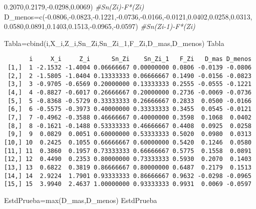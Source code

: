 \documentclass[
  a4paper,
  oneside,
  openany]{book}
\newenvironment{Shaded}{\begin{snugshade}}{\end{snugshade}}
\newcommand{\CommentTok}[1]{\textcolor[rgb]{0.56,0.35,0.01}{\textit{#1}}}
\newcommand{\FloatTok}[1]{\textcolor[rgb]{0.00,0.00,0.81}{#1}}
\newcommand{\FunctionTok}[1]{\textcolor[rgb]{0.00,0.00,0.00}{#1}}
\newcommand{\NormalTok}[1]{#1}
\newcommand{\OtherTok}[1]{\textcolor[rgb]{0.56,0.35,0.01}{#1}}
\newcommand{\SpecialCharTok}[1]{\textcolor[rgb]{0.00,0.00,0.00}{#1}}
\begin{document}
\begin{Shaded}
\begin{Highlighting}[]
        \FloatTok{0.2070}\NormalTok{,}\FloatTok{0.2179}\NormalTok{,}\SpecialCharTok{{-}}\FloatTok{0.0298}\NormalTok{,}\FloatTok{0.0069}\NormalTok{)    }\CommentTok{\#Sn(Zi){-}F*(Zi)}
\NormalTok{D\_menos}\OtherTok{=}\FunctionTok{c}\NormalTok{(}\SpecialCharTok{{-}}\FloatTok{0.0806}\NormalTok{,}\SpecialCharTok{{-}}\FloatTok{0.0823}\NormalTok{,}\SpecialCharTok{{-}}\FloatTok{0.1221}\NormalTok{,}\SpecialCharTok{{-}}\FloatTok{0.0736}\NormalTok{,}\SpecialCharTok{{-}}\FloatTok{0.0166}\NormalTok{,}\SpecialCharTok{{-}}\FloatTok{0.0121}\NormalTok{,}\FloatTok{0.0402}\NormalTok{,}\FloatTok{0.0258}\NormalTok{,}\FloatTok{0.0313}\NormalTok{, }
          \FloatTok{0.0580}\NormalTok{,}\FloatTok{0.0891}\NormalTok{,}\FloatTok{0.1403}\NormalTok{,}\FloatTok{0.1513}\NormalTok{,}\SpecialCharTok{{-}}\FloatTok{0.0965}\NormalTok{,}\SpecialCharTok{{-}}\FloatTok{0.0597}\NormalTok{)   }\CommentTok{\#Sn(Zi{-}1){-}F*(Zi)}

\NormalTok{Tabla}\OtherTok{=}\FunctionTok{cbind}\NormalTok{(i,X\_i,Z\_i,Sn\_Zi,Sn\_Zi\_1,F\_Zi,D\_mas,D\_menos)}
\NormalTok{Tabla}
\end{Highlighting}
\end{Shaded}

\begin{verbatim}
       i     X_i     Z_i      Sn_Zi    Sn_Zi_1   F_Zi   D_mas D_menos
 [1,]  1 -2.1532 -1.4004 0.06666667 0.00000000 0.0806 -0.0139 -0.0806
 [2,]  2 -1.5805 -1.0404 0.13333333 0.06666667 0.1490 -0.0156 -0.0823
 [3,]  3 -0.9705 -0.6569 0.20000000 0.13333333 0.2555 -0.0555 -0.1221
 [4,]  4 -0.8827 -0.6017 0.26666667 0.20000000 0.2736 -0.0069 -0.0736
 [5,]  5 -0.8368 -0.5729 0.33333333 0.26666667 0.2833  0.0500 -0.0166
 [6,]  6 -0.5575 -0.3973 0.40000000 0.33333333 0.3455  0.0545 -0.0121
 [7,]  7 -0.4962 -0.3588 0.46666667 0.40000000 0.3598  0.1068  0.0402
 [8,]  8 -0.1621 -0.1488 0.53333333 0.46666667 0.4408  0.0925  0.0258
 [9,]  9  0.0829  0.0051 0.60000000 0.53333333 0.5020  0.0980  0.0313
[10,] 10  0.2425  0.1055 0.66666667 0.60000000 0.5420  0.1246  0.0580
[11,] 11  0.3860  0.1957 0.73333333 0.66666667 0.5775  0.1558  0.0891
[12,] 12  0.4490  0.2353 0.80000000 0.73333333 0.5930  0.2070  0.1403
[13,] 13  0.6822  0.3819 0.86666667 0.80000000 0.6487  0.2179  0.1513
[14,] 14  2.9224  1.7901 0.93333333 0.86666667 0.9632 -0.0298 -0.0965
[15,] 15  3.9940  2.4637 1.00000000 0.93333333 0.9931  0.0069 -0.0597
\end{verbatim}

\begin{Shaded}
\begin{Highlighting}[]
\NormalTok{EstdPrueba}\OtherTok{=}\FunctionTok{max}\NormalTok{(D\_mas,D\_menos)}
\NormalTok{EstdPrueba}
\end{Highlighting}
\end{Shaded}
\end{document}
